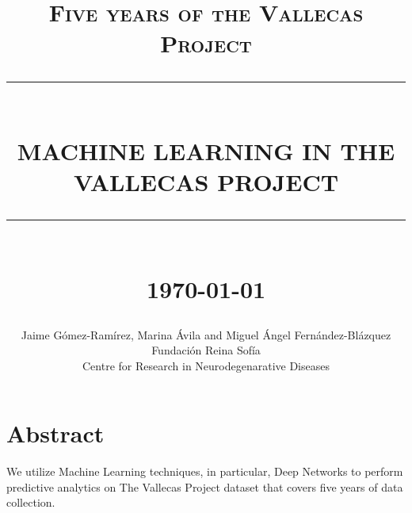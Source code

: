\documentclass[12pt]{report}
\newcommand{\HRule}[1]{\rule{\linewidth}{#1}}
\begin{document}
\title{ \normalsize \textsc{Five years of the Vallecas Project}
		\\ [2.0cm]
		\HRule{0.5pt} \\
		\LARGE \textbf{\uppercase{Machine Learning in the Vallecas Project}}
		\HRule{2pt} \\ [0.5cm]
		\normalsize \today \vspace*{5\baselineskip}}

\date{}

\author{
		Jaime G\'omez-Ram\'irez, Marina \'Avila and Miguel \'Angel Fern\'andez-Bl\'azquez   \\
		Fundaci\'on Reina Sof\'ia \\
		Centre for Research in Neurodegenarative Diseases }

\maketitle
\tableofcontents
\newpage

\sectionfont{\scshape}


\section*{Abstract}

We utilize Machine Learning techniques, in particular, Deep Networks to perform predictive analytics on The Vallecas Project dataset that covers five years of data collection.
\end{document}
